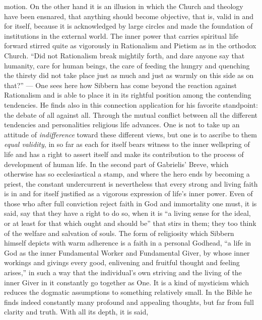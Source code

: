 \documentclass[12pt,a4paper,openany]{book}
\newcommand{\opage}[1]{\marginnote{\footnotesize\textit{[#1]}}}
\begin{document}
motion. On the other hand it is an illusion in which the Church and
theology have been ensnared, that anything should become objective,
that is, valid in and for itself, because it is acknowledged by large
circles and made the foundation of institutions in the external
world. The inner power that carries spiritual life forward
stirred quite as vigorously in Rationalism and Pietism as
in the orthodox Church. ``Did not Rationalism break
mightily forth, and dare anyone say that humanity, care for human beings,
the care of feeding the hungry and quenching the thirsty
did not take place just as much and just as warmly on this
side as on that?'' --- One sees here how Sibbern has
\opage{95}come beyond the reaction against Rationalism and is able
to place it in its rightful position among the
contending tendencies. He finds also in this
connection application for his favorite standpoint: the debate
of all against all. Through the mutual conflict between all
the different tendencies and personalities religious
life advances. One is not to take up an attitude of \emph{indifference} toward these
different views, but one is to ascribe to them \emph{equal
validity}, in so far as each for itself bears witness to the inner
wellspring of life and has a right to assert itself and make its
contribution to the process of development of human life. In the second part of
Gabrielis' Breve, which otherwise has so ecclesiastical a stamp, and
where the hero ends by becoming a priest, the constant
undercurrent is nevertheless that every strong and living faith is in and for itself
justified as a vigorous expression of life's inner power. Even
of those who after full conviction reject faith in
God and immortality one must, it is said, say that
they have a right to do so, when it is ``a living sense for the
ideal, or at least for that which ought and should be'' that stirs
in them; they too think of the welfare and salvation of souls.
The form of religiosity which Sibbern himself depicts with warm
adherence is a faith in a personal Godhead, ``a life in
God as the inner Fundamental Worker and Fundamental Giver, by whose
inner workings and givings every good, enlivening and
fruitful thought and feeling arises,'' in such a way that the individual's
own striving and the living of the inner Giver in it constantly
go together as One. It is a kind of mysticism which reduces the
dogmatic assumptions to something relatively small. In the Bible
he finds indeed constantly many profound and appealing thoughts, but
far from full clarity and truth. With all its depth, it is said,
\end{document}
